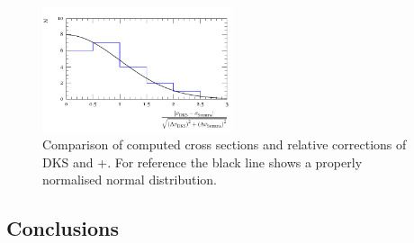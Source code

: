 \begin{figure}[t!]
  \centering
  \includegraphics[width=0.5\textwidth]{comp-dist}
  \caption{
    Comparison of computed cross sections and relative 
    corrections of DKS and \Sherpa{}+\Recola. 
    For reference the black line 
    shows a properly normalised normal distribution.
    \label{fig:WWW:xscomp}
  }
\end{figure}





\subsection{Conclusions}
\label{sec:WWW:conclusions}



\let\Herwig\undefined
\let\Pythia\undefined
\let\Sherpa\undefined
\let\Rivet\undefined
\let\Recola\undefined
\let\Professor\undefined
\let\Amegic\undefined
\let\OpenLoops\undefined
\let\Collier\undefined
\let\eps\undefined
\let\mc\undefined
\let\mr\undefined
\let\mb\undefined
\let\tm\undefined
\let\vp\undefined
\let\vP\undefined




